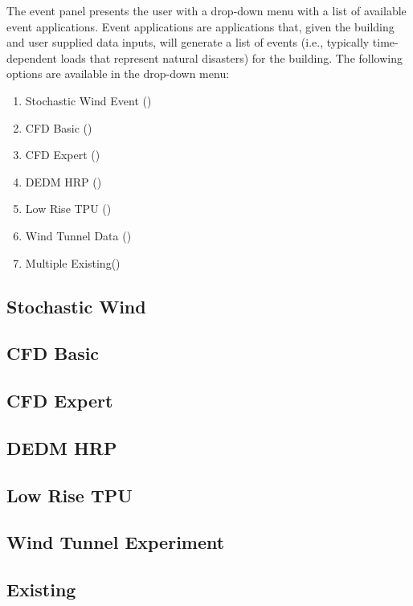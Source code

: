 The event panel presents the user with a drop-down menu with a list of
available event applications. Event applications are applications
that, given the building and user supplied data inputs, will generate
a list of events (i.e., typically time-dependent loads that represent natural disasters) for the building. The following options
are available in the drop-down menu:

\begin{enumerate}
\item Stochastic Wind Event ()
\item CFD Basic ()
\item CFD Expert ()
\item DEDM HRP ()
\item Low Rise TPU ()
\item Wind Tunnel Data ()
\item Multiple Existing()
\end{enumerate}

\subsection{Stochastic Wind}
\label{subsec:stochastic_wind}


\subsection{CFD Basic}
\label{subsec:cfd_basic}


\subsection{CFD Expert}
\label{subsec:cfd_expert}


\subsection{DEDM HRP}
\label{subsec:dedm_hrp}


\subsection{Low Rise TPU}
\label{subsec:lowriseTPU}


\subsection{Wind Tunnel Experiment}
\label{subsec:windTunnelExperiment}


\subsection{Existing}
\label{subsec:multiple_existing}

